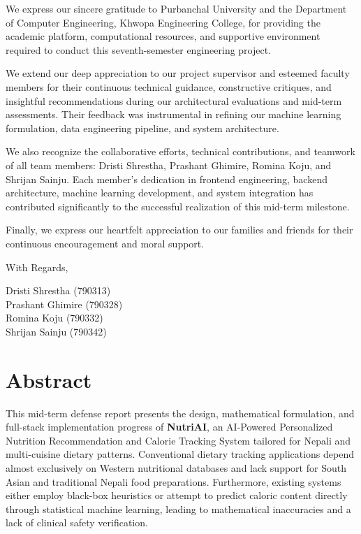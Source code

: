 \documentclass[12pt,a4paper]{report}
\begin{document}
We express our sincere gratitude to Purbanchal University and the Department of Computer Engineering, Khwopa Engineering College, for providing the academic platform, computational resources, and supportive environment required to conduct this seventh-semester engineering project.

We extend our deep appreciation to our project supervisor and esteemed faculty members for their continuous technical guidance, constructive critiques, and insightful recommendations during our architectural evaluations and mid-term assessments. Their feedback was instrumental in refining our machine learning formulation, data engineering pipeline, and system architecture.

We also recognize the collaborative efforts, technical contributions, and teamwork of all team members: Dristi Shrestha, Prashant Ghimire, Romina Koju, and Shrijan Sainju. Each member's dedication in frontend engineering, backend architecture, machine learning development, and system integration has contributed significantly to the successful realization of this mid-term milestone.

Finally, we express our heartfelt appreciation to our families and friends for their continuous encouragement and moral support.

\vspace{0.8cm}
\noindent With Regards,

\vspace{0.5cm}
\noindent Dristi Shrestha \hfill (790313)\\[0.1cm]
\noindent Prashant Ghimire \hfill (790328)\\[0.1cm]
\noindent Romina Koju \hfill (790332)\\[0.1cm]
\noindent Shrijan Sainju \hfill (790342)

\newpage

\chapter*{Abstract}
\thispagestyle{plain}

This mid-term defense report presents the design, mathematical formulation, and full-stack implementation progress of \textbf{NutriAI}, an AI-Powered Personalized Nutrition Recommendation and Calorie Tracking System tailored for Nepali and multi-cuisine dietary patterns. Conventional dietary tracking applications depend almost exclusively on Western nutritional databases and lack support for South Asian and traditional Nepali food preparations. Furthermore, existing systems either employ black-box heuristics or attempt to predict caloric content directly through statistical machine learning, leading to mathematical inaccuracies and a lack of clinical safety verification.
\end{document}
